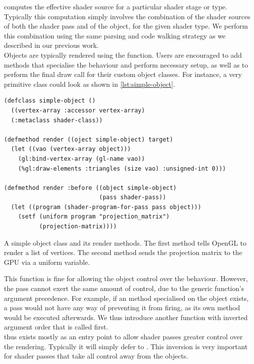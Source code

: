 \documentclass[format=sigconf]{acmart}
\begin{document}
 computes the effective shader source for a particular shader stage or type. Typically this computation simply involves the combination of the shader sources of both the shader pass and of the object, for the given shader type. We perform this combination using the same parsing and code walking strategy as we described in our previous work.\cite{glsloop} \\

Objects are typically rendered using the  function. Users are encouraged to add methods that specialise the behaviour and perform necessary setup, as well as to perform the final draw call for their custom object classes. For instance, a very primitive class could look as shown in \autoref{lst:simple-object}. \\

\begin{listing}[h]
\begin{verbatim}
(defclass simple-object ()
  ((vertex-array :accessor vertex-array)
  (:metaclass shader-class))

(defmethod render ((oject simple-object) target)
  (let ((vao (vertex-array object)))
    (gl:bind-vertex-array (gl-name vao))
    (%gl:draw-elements :triangles (size vao) :unsigned-int 0)))

(defmethod render :before ((object simple-object)
                           (pass shader-pass))
  (let ((program (shader-program-for-pass pass object)))
    (setf (uniform program "projection_matrix")
          (projection-matrix))))
\end{verbatim}
\caption{A simple object class and its render methods. The first method tells OpenGL to render a list of vertices. The second method sends the projection matrix to the GPU via a uniform variable.}
\label{lst:simple-object}
\end{listing}

This function is fine for allowing the object control over the behaviour. However, the pass cannot exert the same amount of control, due to the generic function's argument precedence. For example, if an  method specialised on the object exists, a pass would not have any way of preventing it from firing, as its own  method would be executed afterwards. We thus introduce another function with inverted argument order that is called first. \\

 thus exists mostly as an entry point to allow shader passes greater control over the rendering. Typically it will simply defer to . This inversion is very important for shader passes that take all control away from the objects. \\
\end{document}
